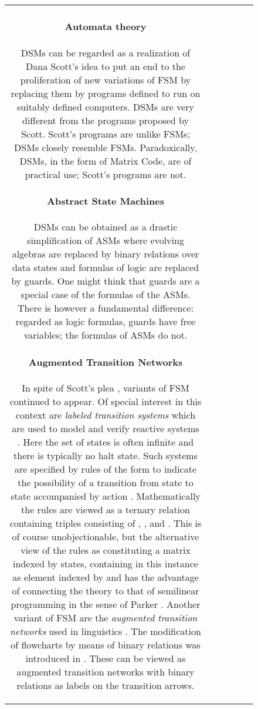 \documentclass[preprint,11pt]{elsarticle}
\begin{document}
\begin{figure}[htbp]
\begin{center}
\begin{minipage}{4in}
\begin{tabular}{c|c|c|c|c|c}
{\paragraph{Automata theory}
DSMs can be regarded as a realization
of Dana Scott's idea
\cite{sctt67} to put an end to the proliferation
of new variations of FSM by replacing them by programs
defined to run on suitably defined computers.
DSMs are very different from the programs proposed by
Scott. Scott's programs are unlike FSMs; DSMs closely
resemble FSMs. Paradoxically, DSMs, in the form
of Matrix Code, are of practical use;
Scott's programs are not.

\paragraph{Abstract State Machines}
DSMs can be obtained as a drastic simplification of
ASMs \cite{brgr03} where evolving algebras are
replaced by binary relations over data states and
formulas of logic are replaced by guards.
One might think that guards are a special case
of the formulas of the ASMs.
There is however a fundamental difference: regarded
as logic formulas, guards have free variables;
the formulas of ASMs do not.

\paragraph{Augmented Transition Networks}
In spite of Scott's plea \cite{sctt67}, variants of
FSM continued to appear.
Of special interest in this context are
\emph{labeled transition systems} which are used
to model and verify reactive systems \cite{brktn08}.
Here the set of states is often infinite
and there is typically no halt state.
Such systems are specified by rules of the
form 
to indicate the possibility of a transition from
state  to state  accompanied by action .
Mathematically the rules are viewed as a ternary relation
containing triples consisting of , , and .
This is of course unobjectionable,
but the alternative view of the rules as constituting
a matrix indexed by states,
containing in this instance  as element indexed
by  and  has the advantage of connecting
the theory to that of semilinear programming
in the sense of Parker \cite{prkr87}.
Another variant of FSM are the \emph{augmented transition networks}
used in linguistics \cite{wds70}.
The modification of flowcharts by means of binary relations
was introduced in \cite{vnmdn79}.
These can be viewed as augmented transition networks
with binary relations as labels on the transition arrows. 

}
\end{tabular}
\end{minipage}
\end{center}
\end{figure}
\end{document}
